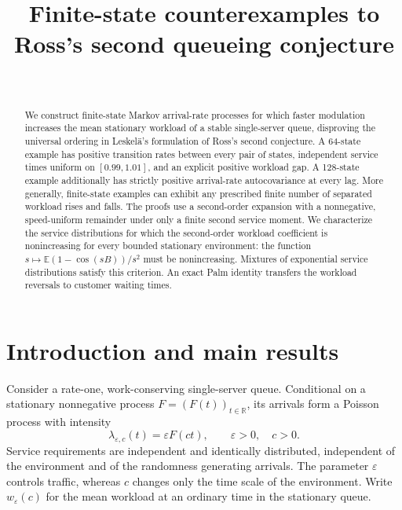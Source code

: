 \documentclass[aap,preprint]{imsart}
\numberwithin{equation}{section}
\theoremstyle{plain}
\theoremstyle{definition}
\newcommand{\E}{\mathbb E}
\newcommand{\R}{\mathbb R}
\newcommand{\1}{\mathbf 1}
\newcommand{\eps}{\varepsilon}
\begin{document}
\begin{frontmatter}
\title{Finite-state counterexamples to Ross's second queueing conjecture}
\begin{aug}
\author[A]{~\ead[label=e1]{}}
\address[A]{Einstein Institute of Mathematics, The Hebrew University of Jerusalem}
\end{aug}
\begin{abstract}
We construct finite-state Markov arrival-rate processes for which faster modulation increases the mean stationary workload of a stable single-server queue, disproving the universal ordering in Leskel\"a's formulation of Ross's second conjecture. A 64-state example has positive transition rates between every pair of states, independent service times uniform on $[0.99,1.01]$, and an explicit positive workload gap. A 128-state example additionally has strictly positive arrival-rate autocovariance at every lag. More generally, finite-state examples can exhibit any prescribed finite number of separated workload rises and falls. The proofs use a second-order expansion with a nonnegative, speed-uniform remainder under only a finite second service moment. We characterize the service distributions for which the second-order workload coefficient is nonincreasing for every bounded stationary environment: the function $s\mapsto\E(1-\cos(sB))/s^2$ must be nonincreasing. Mixtures of exponential service distributions satisfy this criterion. An exact Palm identity transfers the workload reversals to customer waiting times.
\end{abstract}
\begin{keyword}[class=MSC]
\end{keyword}
\begin{keyword}
\end{keyword}
\end{frontmatter}

\section{Introduction and main results}\label{sec:intro}
Consider a rate-one, work-conserving single-server queue. Conditional on a stationary nonnegative process $F=(F(t))_{t\in\R}$, its arrivals form a Poisson process with intensity
\begin{equation}\label{eq:arrival}
 \lambda_{\eps,c}(t)=\eps F(ct),\qquad \eps>0,\quad c>0.
\end{equation}
Service requirements are independent and identically distributed, independent of the environment and of the randomness generating arrivals. The parameter $\eps$ controls traffic, whereas $c$ changes only the time scale of the environment. Write $w_\eps(c)$ for the mean workload at an ordinary time in the stationary queue.
\end{document}
